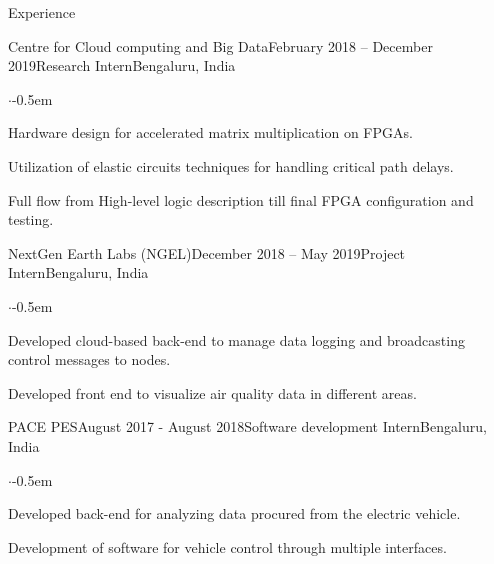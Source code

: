 \documentclass{CV} %
\begin{document}
\begin{rSection}{Experience}
  \begin{rSubsection}{Centre for Cloud computing and Big Data}{February 2018 -- December 2019}{Research Intern}{Bengaluru, India}
    \begin{list}{$\cdot$}{\footnotesize}\itemsep -0.5em \vspace{-0.5em}
      \item Hardware design for accelerated matrix multiplication on FPGAs.
      \item Utilization of elastic circuits techniques for handling critical path delays.
      \item Full flow from High-level logic description till final FPGA configuration and testing.
    \end{list}
  \end{rSubsection}

  \begin{rSubsection}{NextGen Earth Labs (NGEL)}{December 2018 -- May 2019}{Project Intern}{Bengaluru, India}
    \begin{list}{$\cdot$}{\footnotesize}\itemsep -0.5em \vspace{-0.5em}
      \item Developed cloud-based back-end to manage data logging and broadcasting control messages to nodes.
      \item Developed front end to visualize air quality data in different areas.
    \end{list}
  \end{rSubsection}

  \begin{rSubsection}{PACE PES}{August 2017 - August 2018}{Software development Intern}{Bengaluru, India}
    \begin{list}{$\cdot$}{\footnotesize}\itemsep -0.5em \vspace{-0.5em}
      \item Developed back-end for analyzing data procured from the electric vehicle.
      \item Development of software for vehicle control through multiple interfaces.
    \end{list}
  \end{rSubsection}
  
\end{rSection}



\end{document}
